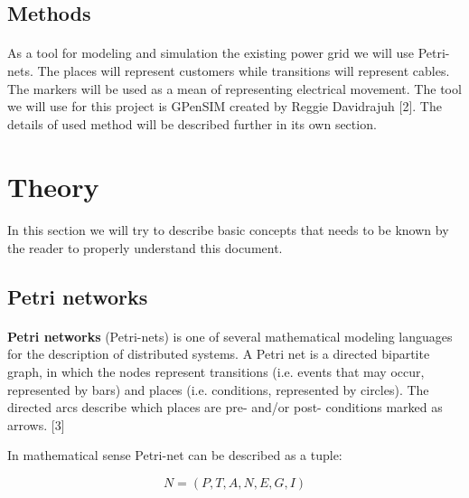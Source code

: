 \documentclass[a4paper]{article}
\begin{document}
\subsection{Methods}
\label{sec:methods}
\paragraph{}
As a tool for modeling and simulation the existing power grid we will use Petri-nets. The places will represent customers while transitions will represent cables. The markers will be used as a mean of representing electrical movement. The tool we will use for this project is GPenSIM created by Reggie Davidrajuh [2]. The details of used method will be described further in its own section.

\clearpage

%
\section{Theory}
\label{cha:theory}
\paragraph{}

In this section we will try to describe basic concepts that needs to be known by the reader to properly understand this document.

\subsection{Petri networks}
\label{sec:petriNetworks}
\paragraph{}

\textbf{Petri networks} (Petri-nets) is one of several mathematical modeling languages for the description of distributed systems. A Petri net is a directed bipartite graph, in which the nodes represent transitions (i.e. events that may occur, represented by bars) and places (i.e. conditions, represented by circles). The directed arcs describe which places are pre- and/or post- conditions marked  as arrows. [3]

In mathematical sense Petri-net can be described as a tuple:

\begin{equation}
N = ( P, T, A, N, E, G, I )
\end{equation}
\end{document}
